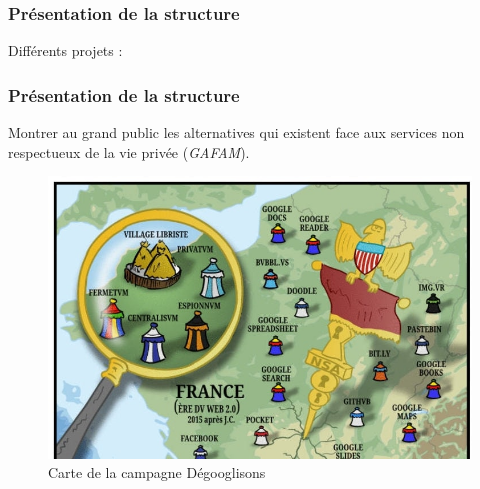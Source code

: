 \documentclass[12pt]{beamer}
\begin{document}
	\begin{frame}
		\frametitle{Présentation de la structure}
		Différents projets :
		\begin{itemize}
		\end{itemize}
	\end{frame}
	\begin{frame}
		\frametitle{Présentation de la structure}
		\begin{minipage}{0.45\textwidth}
			\begin{flushleft}
				Montrer au grand public les alternatives qui existent face aux services non respectueux de la vie privée (\textit{GAFAM}).
			\end{flushleft}
		\end{minipage}
		\begin{minipage}{0.45\textwidth}
			\begin{flushright}
				\begin{figure}[ht]
					\centering
					\includegraphics[width=0.9\linewidth]{images/degooglisons-internet}
					\caption{Carte de la campagne Dégooglisons}
					\label{fig:degooglisons-carte}
				\end{figure}
			\end{flushright}
		\end{minipage}
		

\end{frame}
\end{document}
